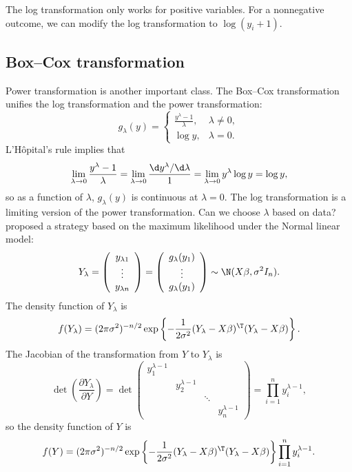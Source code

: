 The log transformation only works for positive variables. 
For a nonnegative outcome, we can modify the log transformation to $\log (y_{i} + 1).$ 



\subsection{Box--Cox transformation}

Power transformation is another important class.
The Box--Cox transformation unifies the log transformation and the
power transformation:
\[
g_{\lambda}(y)=\begin{cases}
\frac{y^{\lambda}-1}{\lambda}, & \lambda\neq0,\\
\log y, & \lambda=0.
\end{cases}
\]
L'H\^opital's rule implies that 
\[
\lim_{\lambda\rightarrow0}\frac{y^{\lambda}-1}{\lambda}=\lim_{\lambda\rightarrow0}\frac{\d y^{\lambda}/\d\lambda}{1}=\lim_{\lambda\rightarrow0}y^{\lambda}\log y=\log y,
\]
so as a function of $\lambda$, $g_{\lambda}(y)$ is continuous at
$\lambda = 0$. The log transformation is a limiting version of the power transformation. Can we choose $\lambda$ based on data? \citet{box1964analysis} proposed
a strategy based on the maximum likelihood under the Normal linear model:
\[
Y_{\lambda}=\left(\begin{array}{c}
y_{\lambda1}\\
\vdots\\
y_{\lambda n}
\end{array}\right)=\left(\begin{array}{c}
g_{\lambda}(y_{1})\\
\vdots\\
g_{\lambda}(y_{1})
\end{array}\right)\sim\N(X\beta,\sigma^{2}I_{n}).
\]
The density function of $Y_{\lambda}$ is 
\[
f(Y_{\lambda})=(2\pi\sigma^{2})^{-n/2}\exp\left\{ -\frac{1}{2\sigma^{2}}(Y_{\lambda}-X\beta)^{\T}(Y_{\lambda}-X\beta)\right\} .
\]
The Jacobian of the transformation from $Y$ to $Y_{\lambda}$ is
\[
\det\left(\frac{\partial Y_{\lambda}}{\partial Y}\right)=\det\left(\begin{array}{cccc}
y_{1}^{\lambda-1}\\
 & y_{2}^{\lambda-1}\\
 &  & \ddots\\
 &  &  & y_{n}^{\lambda-1}
\end{array}\right)=\prod_{i=1}^{n}y_{i}^{\lambda-1},
\]
so the density function of $Y$ is 
\[
f(Y)=(2\pi\sigma^{2})^{-n/2}\exp\left\{ -\frac{1}{2\sigma^{2}}(Y_{\lambda}-X\beta)^{\T}(Y_{\lambda}-X\beta)\right\} \prod_{i=1}^{n}y_{i}^{\lambda-1}.
\]
